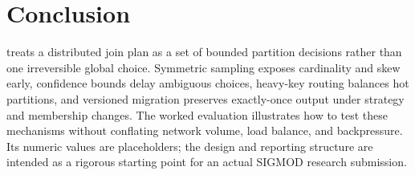 \section{Conclusion}
\label{sec:conclusion}

\system{} treats a distributed join plan as a set of bounded partition
decisions rather than one irreversible global choice.  Symmetric sampling
exposes cardinality and skew early, confidence bounds delay ambiguous choices,
heavy-key routing balances hot partitions, and versioned migration preserves
exactly-once output under strategy and membership changes.  The worked
evaluation illustrates how to test these mechanisms without conflating network
volume, load balance, and backpressure.  Its numeric values are placeholders;
the design and reporting structure are intended as a rigorous starting point
for an actual SIGMOD research submission.


